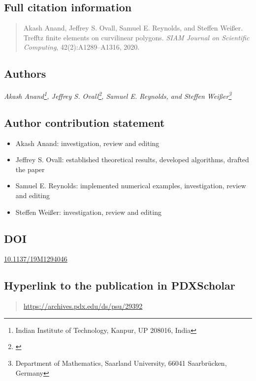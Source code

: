 \subsection*{Full citation information}
  \singlespacing
  \begin{quote}
    Akash Anand, Jeffrey S. Ovall, Samuel E. Reynolds, and Steffen Wei\ss{}er.
    Trefftz finite elements on curvilinear polygons.
    \textit{SIAM Journal on Scientific Computing}, 42(2):A1289--A1316, 2020.
  \end{quote}
  \doublespacing

\subsection*{Authors}
  \textit{Akash Anand\footnote{Indian Institute of Technology, Kanpur, UP 208016, India},
  Jeffrey S. Ovall\footnote{\label{PSU-affil-2}\PSU},
  Samuel E. Reynolds, and
  Steffen Wei\ss{}er\footnote{Department of Mathematics,
  Saarland University, 66041 Saarbr\"ucken, Germany}}

\subsection*{Author contribution statement}
    \singlespacing
    \begin{itemize}
      \item Akash Anand: investigation, review and editing
      \item Jeffrey S. Ovall:  established theoretical results, developed algorithms, drafted the paper
      \item Samuel E. Reynolds: implemented numerical examples, investigation, review and editing
      \item Steffen Wei\ss{}er: investigation, review and editing
    \end{itemize}
    \doublespacing

\subsection*{DOI}
  \href{https://doi.org/10.1137/19M1294046}{10.1137/19M1294046}

\subsection*{Hyperlink to the publication in PDXScholar}
  \begin{quote}
    \url{https://archives.pdx.edu/ds/psu/29392}
  \end{quote}